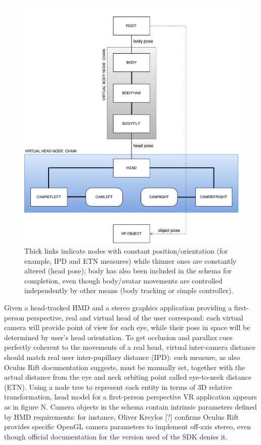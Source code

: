 \begin{figure}
\centering
\includegraphics[width=\linewidth]{schemas/classic-head-model_nodetree}
\caption{Thick links indicate nodes with constant position/orientation (for example, IPD and ETN measures) while thinner ones are constantly altered (head pose); body has also been included in the schema for completion, even though body/avatar movements are controlled independently by other means (body tracking or simple controller).}
\label{fig:classic_head_model}
\end{figure}

Given a head-tracked HMD and a stereo graphics application providing a first-person perspective, real and virtual head of the user correspond: each virtual camera will provide point of view for each eye, while their pose in space will be determined by user's head orientation. To get occlusion and parallax cues perfectly coherent to the movements of a real head, virtual inter-camera distance should match real user inter-pupillary distance (IPD): such measure, as also Oculus Rift documentation suggests, must be manually set, together with the actual distance from the eye and neck orbiting point called eye-to-neck distance (ETN). Using a node tree to represent each entity in terms of 3D relative transformation, head model for a first-person perspective VR application appears as in figure N. Camera objects in the schema contain intrinsic parameters defined by HMD requirements: for instance, Oliver Kreylos [?] confirms Oculus Rift provides specific OpenGL camera parameters to implement off-axis stereo, even though official documentation for the version used of the SDK denies it.

